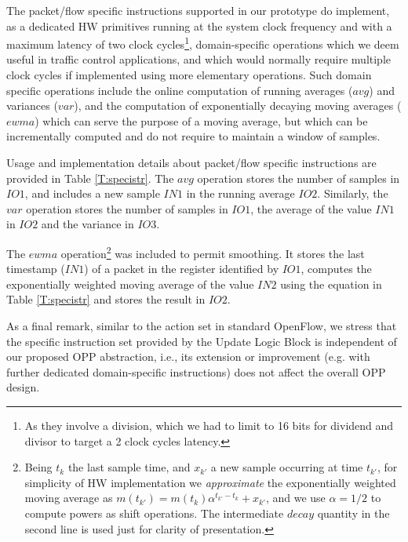 \documentclass{sig-alternate}
\begin{document}
The packet/flow specific instructions supported in our prototype do implement, as a dedicated HW primitives running at the system clock frequency and with a maximum latency of two clock cycles\footnote{As they involve a division, which we had to limit to 16 bits for dividend and divisor to target a 2 clock cycles latency.}, domain-specific operations which we deem useful in traffic control applications, and which would normally require multiple clock cycles if implemented using more elementary operations. Such domain specific operations include the online computation of running averages ($avg$) and variances ($var$), and the computation of exponentially decaying moving averages ($ewma$) which can serve the purpose of a moving average, but which can be incrementally computed and do not require to maintain a window of samples. 

Usage and implementation details about packet/flow specific instructions are provided in Table \ref{T:specistr}. The $avg$ operation stores the number of samples in $IO1$, and includes a new sample $IN1$ in  the running average $IO2$. Similarly, the $var$ operation stores the number of samples in $IO1$, the average of the value $IN1$ in $IO2$ and the variance in $IO3$.

The $ewma$ operation\footnote{Being $t_k$ the last sample time, and $x_{k'}$ a new sample occurring at time $t_{k'}$, for simplicity of HW implementation we {\em approximate} the exponentially weighted moving average as $m(t_{k'})=m(t_k) \alpha^{t_{k'}-t_k} + x_{k'}$, and we use $\alpha=1/2$ to compute powers as shift operations. The intermediate $decay$ quantity in the second line is used just for clarity of presentation.}
was included to permit smoothing. It stores the last timestamp ($IN1$) of a packet in the register identified by $IO1$, computes the exponentially weighted moving average of the value $IN2$ using the equation in Table \ref{T:specistr} and stores the result in $IO2$.

As a final remark, similar to the action set in standard OpenFlow, we stress that the specific instruction set provided by the Update Logic Block is independent of our proposed OPP abstraction, i.e., its extension or improvement (e.g. with further dedicated domain-specific instructions) does not affect the overall OPP design.
\end{document}
